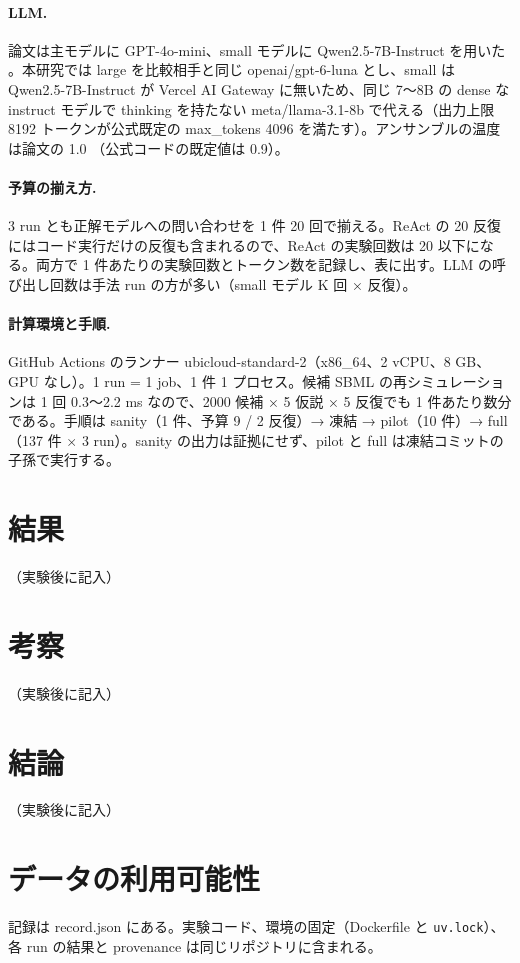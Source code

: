 \documentclass{article}
\providecommand{\airasrecordlink}[1]{#1}
\begin{document}
\paragraph{LLM.}
論文は主モデルに GPT-4o-mini、small モデルに Qwen2.5-7B-Instruct を用いた \cite[s2.p4]{kabra-2026-llm}。本研究では large を比較相手と同じ openai/gpt-6-luna とし、small は Qwen2.5-7B-Instruct が Vercel AI Gateway に無いため、同じ 7〜8B の dense な instruct モデルで thinking を持たない meta/llama-3.1-8b で代える（出力上限 8192 トークンが公式既定の max\_tokens 4096 を満たす）。アンサンブルの温度は論文の 1.0 \cite[s2.p13]{kabra-2026-llm}（公式コードの既定値は 0.9）。

\paragraph{予算の揃え方.}
3 run とも正解モデルへの問い合わせを 1 件 20 回で揃える。ReAct の 20 反復にはコード実行だけの反復も含まれるので、ReAct の実験回数は 20 以下になる。両方で 1 件あたりの実験回数とトークン数を記録し、表に出す。LLM の呼び出し回数は手法 run の方が多い（small モデル K 回 × 反復）。

\paragraph{計算環境と手順.}
GitHub Actions のランナー ubicloud-standard-2（x86\_64、2 vCPU、8 GB、GPU なし）。1 run = 1 job、1 件 1 プロセス。候補 SBML の再シミュレーションは 1 回 0.3〜2.2 ms なので、2000 候補 × 5 仮説 × 5 反復でも 1 件あたり数分である。手順は sanity（1 件、予算 9 / 2 反復）→ 凍結 → pilot（10 件）→ full（137 件 × 3 run）。sanity の出力は証拠にせず、pilot と full は凍結コミットの子孫で実行する。


\section{結果}
\label{sec:results}
（実験後に記入）

\section{考察}
\label{sec:discussion}
（実験後に記入）

\section{結論}
\label{sec:conclusion}
（実験後に記入）

\section*{データの利用可能性}
記録は \airasrecordlink{record.json} にある。実験コード、環境の固定（Dockerfile と \texttt{uv.lock}）、各 run の結果と provenance は同じリポジトリに含まれる。



\end{document}
